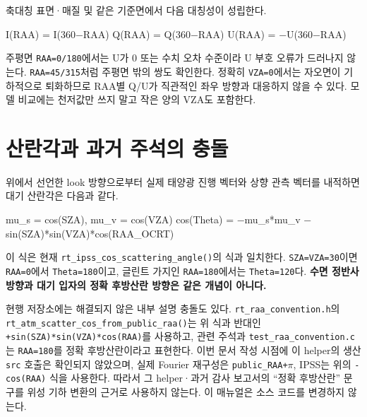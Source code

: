 축대칭 표면·매질 및 같은 기준면에서 다음 대칭성이 성립한다.


\begin{ManualCode}
I(RAA) =  I(360−RAA)
Q(RAA) =  Q(360−RAA)
U(RAA) = −U(360−RAA)
\end{ManualCode}

주평면 \texttt{RAA=\allowbreak{}0/\allowbreak{}180\textdegree{}}에서는 U가 0 또는 수치 오차 수준이라 U 부호 오류가 드러나지 않는다. \texttt{RAA=\allowbreak{}45/\allowbreak{}315\textdegree{}}처럼 주평면 밖의 쌍도 확인한다. 정확히 \texttt{VZA=\allowbreak{}0\textdegree{}}에서는 자오면이 기하적으로 퇴화하므로 RAA별 Q/U가 직관적인 좌우 방향과 대응하지 않을 수 있다. 모델 비교에는 천저값만 쓰지 말고 작은 양의 VZA도 포함한다.

\section{산란각과 과거 주석의 충돌}
\label{sec:auto:01_concepts_geometry:7}
위에서 선언한 look 방향으로부터 실제 태양광 진행 벡터와 상향 관측 벡터를 내적하면 대기 산란각은 다음과 같다.


\begin{ManualCode}
mu_s = cos(SZA), mu_v = cos(VZA)
cos(Theta) = −mu_s*mu_v − sin(SZA)*sin(VZA)*cos(RAA_OCRT)
\end{ManualCode}

이 식은 현재 \texttt{rt\_\allowbreak{}ipss\_\allowbreak{}cos\_\allowbreak{}scattering\_\allowbreak{}angle()}의 식과 일치한다. \texttt{SZA=\allowbreak{}VZA=\allowbreak{}30\textdegree{}}이면 \texttt{RAA=\allowbreak{}0\textdegree{}}에서 \texttt{Theta=\allowbreak{}180\textdegree{}}이고, 글린트 가지인 \texttt{RAA=\allowbreak{}180\textdegree{}}에서는 \texttt{Theta=\allowbreak{}120\textdegree{}}다. \textbf{수면 정반사 방향과 대기 입자의 정확 후방산란 방향은 같은 개념이 아니다.}

현행 저장소에는 해결되지 않은 내부 설명 충돌도 있다. \texttt{rt\_\allowbreak{}raa\_\allowbreak{}convention.\allowbreak{}h}의 \texttt{rt\_\allowbreak{}atm\_\allowbreak{}scatter\_\allowbreak{}cos\_\allowbreak{}from\_\allowbreak{}public\_\allowbreak{}raa()}는 위 식과 반대인 \texttt{+sin(SZA)*sin(VZ\allowbreak{}A)*cos(RAA)}를 사용하고, 관련 주석과 \texttt{test\_\allowbreak{}raa\_\allowbreak{}convention.\allowbreak{}c}는 \texttt{RAA=\allowbreak{}180\textdegree{}}를 정확 후방산란이라고 표현한다. 이번 문서 작성 시점에 이 helper의 생산 \texttt{src} 호출은 확인되지 않았으며, 실제 Fourier 재구성은 \texttt{public\_\allowbreak{}RAA+\ensuremath{\pi}}, IPSS는 위의 \texttt{-cos(RAA)} 식을 사용한다. 따라서 그 helper·과거 감사 보고서의 “정확 후방산란” 문구를 위성 기하 변환의 근거로 사용하지 않는다. 이 매뉴얼은 소스 코드를 변경하지 않는다.

